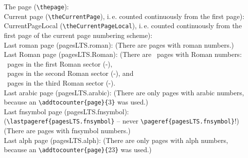 \documentclass[british]{article}
\def\pagesLTSexampleArabic{3}
\def\pagesLTSexamplealph{23}
\begin{document}
\noindent The page (\verb|\thepage|): \thepage \\

\noindent Current page (\verb|\theCurrentPage|),
i.\,e. counted continuously from the first page): \theCurrentPage \\

\noindent CurrentPageLocal (\verb|\theCurrentPageLocal|),
i.\,e. counted continuously from the first page of the
current page numbering scheme): \theCurrentPageLocal \\

\noindent Last roman page (pagesLTS.roman): 
(There are  pages with roman numbers.)\\

\noindent Last Roman page (pagesLTS.Roman): 
(There are ~pages with Roman numbers:\\
~pages in the first Roman sector
(\pageref{Roman}{\hskip3em }-),\\
~pages in the second Roman sector
(\pageref{Roman2}{\hskip3em }-), and\\
~pages in the third Roman sector
(\pageref{Roman3}{\hskip3em }-).\\

\noindent Last arabic page (pagesLTS.arabic): 
(There are only  pages with arabic numbers,
because an \verb|\addtocounter{page}{|\pagesLTSexampleArabic\verb|}| was used.)\\

\noindent Last fnsymbol page (pagesLTS.fnsymbol):  \\
(\verb|\lastpageref{pagesLTS.fnsymbol}| -- never \verb|\pageref{pagesLTS.fnsymbol}|!)\\
(There are  pages with fnsymbol numbers.)\\

\noindent Last alph page (pagesLTS.alph): 
(There are only  pages with alph numbers,
because an \verb|\addtocounter{page}{|\pagesLTSexamplealph\verb|}| was used.)\\
\end{document}
